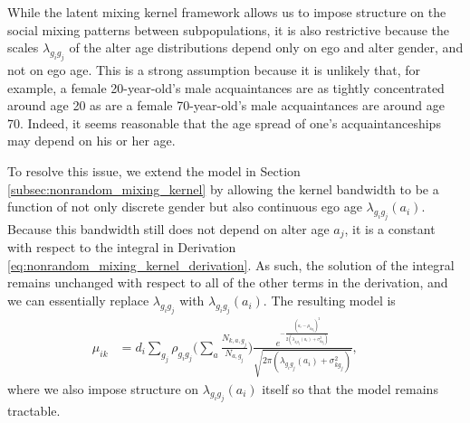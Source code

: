 While the latent mixing kernel framework allows us to impose structure on the social mixing patterns between subpopulations, it is also restrictive because the scales $\lambda_{g_ig_j}$ of the alter age distributions depend only on ego and alter gender, and not on ego age. This is a strong assumption because it is unlikely that, for example, a female 20-year-old's male acquaintances are as tightly concentrated around age 20 as are a female 70-year-old's male acquaintances are around age 70. Indeed, it seems reasonable that the age spread of one's acquaintanceships may depend on his or her age.

To resolve this issue, we extend the model in Section \ref{subsec:nonrandom_mixing_kernel} by allowing the kernel bandwidth to be a function of not only discrete gender but also continuous ego age $\lambda_{g_ig_j}(a_i)$. Because this bandwidth still does not depend on alter age $a_j$, it is a constant with respect to the integral in Derivation \ref{eq:nonrandom_mixing_kernel_derivation}. As such, the solution of the integral remains unchanged with respect to all of the other terms in the derivation, and we can essentially replace $\lambda_{g_ig_j}$ with $\lambda_{g_ig_j}(a_i)$. The resulting model is
\begin{align}
\mu_{ik} 
&= d_i \sum_{g_j} \rho_{g_ig_j} 
\biggl( \sum_{a} \frac{ N_{k, a, g_j} }{ N_{a, g_j} } \biggr) 
\frac{ e^{ -\frac{ (a_i - \mu_{kg_j})^2 }{ 2(\lambda_{g_ig_j}(a_i) + \sigma_{kg_j}^2) } } }{ \sqrt{ 2\pi(\lambda_{g_ig_j}(a_i) + \sigma_{kg_j}^2) } },
&& \label{eq:nonrandom_mixing_kernel_with_spline} 
\end{align}
where we also impose structure on $\lambda_{g_ig_j}(a_i)$ itself so that the model remains tractable. 

